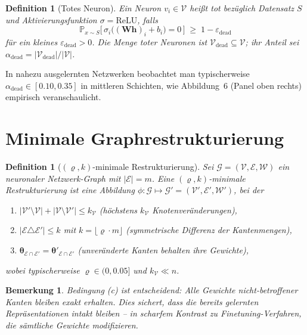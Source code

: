 \documentclass[12pt, a4paper, openany]{report}
\newtheorem{definition}[theorem]{Definition}
\newtheorem{remark}[theorem]{Bemerkung}
\newcommand{\Prob}{\mathbb{P}}
\newcommand{\calG}{\mathcal{G}}
\newcommand{\calV}{\mathcal{V}}
\newcommand{\calE}{\mathcal{E}}
\newcommand{\calW}{\mathcal{W}}
\newcommand{\eps}{\varepsilon}
\begin{document}
\begin{definition}[Totes Neuron]
\label{def:dead}
Ein Neuron $v_i \in \calV$ heißt \emph{tot} bezüglich Datensatz $S$ und
Aktivierungsfunktion $\sigma = \mathrm{ReLU}$, falls
\[
  \Prob_{x \sim S}\!\bigl[\,\sigma_i\bigl((\bm{W}\bm{h})_i + b_i\bigr) = 0\,\bigr]
  \;\geq\; 1 - \eps_{\mathrm{dead}}
\]
für ein kleines $\eps_{\mathrm{dead}} > 0$.  Die Menge toter Neuronen ist
$\calV_{\mathrm{dead}} \subseteq \calV$; ihr Anteil sei
$\alpha_{\mathrm{dead}} = |\calV_{\mathrm{dead}}|/|\calV|$.
\end{definition}

In nahezu ausgelernten Netzwerken beobachtet man typischerweise
$\alpha_{\mathrm{dead}} \in [0.10, 0.35]$ in mittleren Schichten, wie
Abbildung~6 (Panel oben rechts) empirisch veranschaulicht.

\section{Minimale Graphrestrukturierung}

\begin{definition}[$(\varrho, k)$-minimale Restrukturierung]
\label{def:restr}
Sei $\calG = (\calV, \calE, \calW)$ ein neuronaler Netzwerk-Graph mit
$|\calE| = m$.  Eine \emph{$(\varrho, k)$-minimale Restrukturierung} ist
eine Abbildung $\phi : \calG \mapsto \calG' = (\calV', \calE', \calW')$, bei der
\begin{enumerate}[label=(\alph*)]
  \item $|\calV' \setminus \calV| + |\calV \setminus \calV'| \leq k_{\calV}$
        \quad (höchstens $k_{\calV}$ Knotenveränderungen),
  \item $|\calE \triangle \calE'| \leq k$ mit $k = \lfloor \varrho \cdot m \rfloor$
        \quad (symmetrische Differenz der Kantenmengen),
  \item $\bm{\theta}_{\calE \cap \calE'} = \bm{\theta}'_{\calE \cap \calE'}$
        \quad (unveränderte Kanten behalten ihre Gewichte),
\end{enumerate}
wobei typischerweise $\varrho \in (0, 0.05]$ und $k_{\calV} \ll n$.
\end{definition}

\begin{remark}
Bedingung (c) ist entscheidend: Alle Gewichte nicht-betroffener Kanten bleiben
exakt erhalten.  Dies sichert, dass die bereits gelernten Repräsentationen
intakt bleiben -- in scharfem Kontrast zu Finetuning-Verfahren, die sämtliche
Gewichte modifizieren.
\end{remark}
\end{document}
